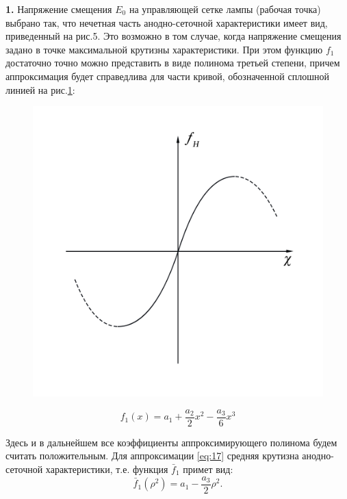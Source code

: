 {\bfseries 1.} Напряжение смещения $E_{0}$ на управляющей сетке лампы (рабочая точка) выбрано так, что нечетная часть анодно-сеточной характеристики имеет вид,  приведенный на рис.5. Это возможно в том случае, когда напряжение смещения задано в точке максимальной крутизны характеристики. При этом функцию $f_{1}$ достаточно точно можно представить в виде полинома третьей степени, причем аппроксимация будет справедлива для части кривой, обозначенной сплошной линией на рис.\ref{fig:5}:
\begin{figure}
    \begin{center}
        \includegraphics[width=\linewidth]{photo/pics/Ris5.png}
        \vspace{-40pt}
        \caption{}
        \label{fig:5}
    \end{center}
\end{figure}   
\begin{equation}
\label{eq:17}
f_1(x)=a_1+\frac{a_2}{2}x^2-\frac{a_3}{6}x^3
\end{equation}

Здесь и в дальнейшем все коэффициенты аппроксимирующего полинома будем считать положительным. Для аппроксимации \eqref{eq:17} средняя крутизна анодно-сеточной характеристики, т.е. функция $\bar{f}_1$ примет вид:
\begin{equation}
\label{eq:18}
\bar{f}_1(\rho^2)=a_1-\frac{a_3}{2}\rho^2.
\end{equation}

